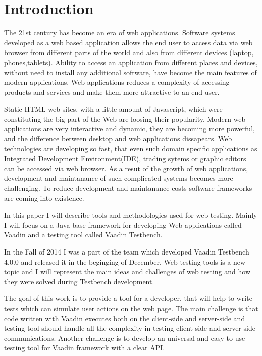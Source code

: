 	
	 \chapter{Introduction}
	 \label{ch:intro} 		
	The 21st century has become an era of web applications. Software systems
	developed as a web based application allows the end user to access data via
	web browser from different parts of the world and also from different devices (laptop,
	phones,tablets). Ability to access an application from different places and
	devices, without need to install any additional software,
	have become the main features of modern applications. Web applications reduces a complexity 
	of accessing products and services and make them more attractive to an end
	user.
	
	Static HTML web sites, with a little amount of Javascript, which
	were constituting the big part of the Web are loosing their popularity.
	Modern web	applications are very interactive and dynamic, they are becoming
	more powerful, and the difference between desktop and web applications
	dissapears. Web technologies are developing so fast, that even such domain
	specific applications as Integrated Development Environment(IDE), trading
	sytems or graphic editors can be accessed via web browser. As a resut of the
	growth of web applications, development and maintanance of such complicated
	systems becomes more challenging. To reduce development and maintanance costs
	software frameworks are coming into existence.
	
	In this paper I will describe tools and methodologies used for web testing. Mainly I will focus on a Java-base
	framework for developing Web applications called Vaadin and a testing tool
	called Vaadin Testbench.
	
	 In the Fall of 2014 I was a part of the team which developed Vaadin Testbench
	 4.0.0 and released it in the beginging of December. Web testing tools is a
	 new topic and I will represent the main ideas and challenges
	 of web testing and how they were solved during Testbench development.
	 
	 The goal of this work is to provide a tool for a developer, that will help to
	 write tests which can simulate user actions on the web page. The main
	 challenge is that code written with Vaadin executes both on the
	 client-side and server-side and testing tool should handle all the complexity
	 in testing client-side and server-side communications. Another challenge is to
	 develop an universal and easy to use testing tool for Vaadin framework with a
	 clear API.
	 
